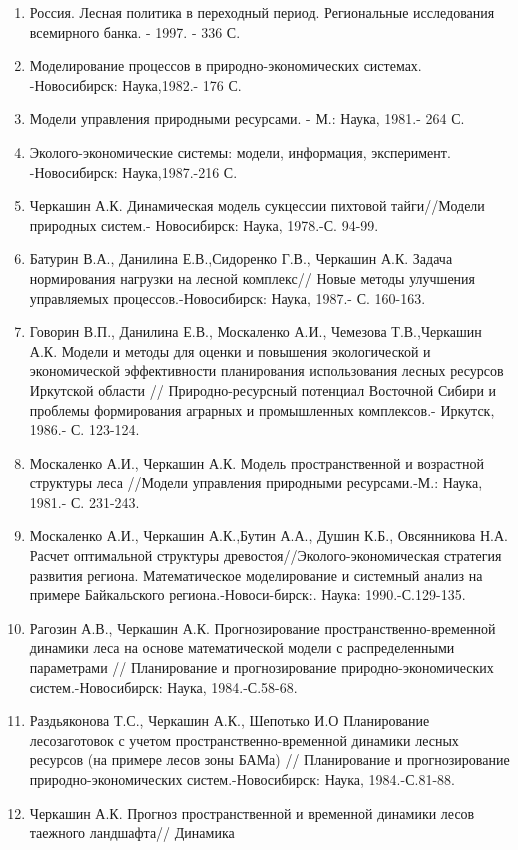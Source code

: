 \documentclass{report}
\begin{document}
\begin{enumerate}
\item  Россия. Лесная политика в переходный период. Региональные исследования всемирного банка. - 1997. - 336 С.
\item  Моделирование процессов в природно-экономических системах. -Новосибирск: Наука,1982.- 176 С.
\item  Модели управления природными ресурсами. - М.: Наука, 1981.- 264 С.
\item  Эколого-экономические системы: модели, информация, эксперимент. -Новосибирск: Наука,1987.-216 С.
\item  Черкашин А.К. Динамическая модель сукцессии пихтовой тайги//Модели природных систем.- Новосибирск: Наука,
1978.-С. 94-99.
\item  Батурин В.А., Данилина Е.В.,Сидоренко Г.В., Черкашин А.К. Задача нормирования нагрузки на лесной комплекс// Новые
методы улучшения управляемых процессов.-Новосибирск: Наука, 1987.- С. 160-163.
\item  Говорин В.П., Данилина Е.В., Москаленко А.И., Чемезова Т.В.,Черкашин А.К. Модели и методы для оценки и повышения
экологической и экономической эффективности планирования использования лесных ресурсов Иркутской области //
Природно-ресурсный потенциал Восточной Сибири и проблемы формирования аграрных и промышленных комплексов.- Иркутск,
1986.- С. 123-124.
\item  Москаленко А.И., Черкашин А.К. Модель пространственной и возрастной структуры леса //Модели управления природными
ресурсами.-М.: Наука, 1981.- С. 231-243.
\item  Москаленко А.И., Черкашин А.К.,Бутин А.А., Душин К.Б., Овсянникова Н.А. Расчет оптимальной структуры
древостоя//Эколого-экономическая стратегия развития региона. Математическое моделирование и системный анализ на примере
Байкальского региона.-Новоси-бирск:. Наука: 1990.-С.129-135.
\item  Рагозин А.В., Черкашин А.К. Прогнозирование пространственно-временной динамики леса на основе математической
модели  с распределенными  параметрами //  Планирование  и прогнозирование природно-экономических систем.-Новосибирск:
Наука, 1984.-С.58-68.
\item  Раздьяконова Т.С., Черкашин А.К., Шепотько И.О Планирование лесозаготовок с учетом пространственно-временной
динамики лесных ресурсов (на примере лесов зоны БАМа) // Планирование и прогнозирование природно-экономических
систем.-Новосибирск: Наука, 1984.-С.81-88.
\item  Черкашин А.К. Прогноз пространственной и временной динамики лесов таежного ландшафта// Динамика

\end{enumerate}
\end{document}
